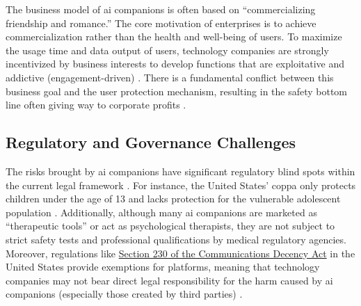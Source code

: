 The business model of \gls{ai} companions is often based on ``commercializing friendship and romance.'' The core motivation of enterprises is to achieve commercialization rather than the health and well-being of users. To maximize the usage time and data output of users, technology companies are strongly incentivized by business interests to develop functions that are exploitative and addictive (engagement-driven) \cite[p.~6370, 6374]{bakir_move_2025}. There is a fundamental conflict between this business goal and the user protection mechanism, resulting in the safety bottom line often giving way to corporate profits \cite[p.~81]{branch_ai_2025} \cite[p.~6373]{bakir_move_2025}.


\subsection{Regulatory and Governance Challenges}

The risks brought by \gls{ai} companions have significant regulatory blind spots within the current legal framework \cite[p.~82]{branch_ai_2025}. For instance, the United States' \gls{coppa} only protects children under the age of 13 and lacks protection for the vulnerable adolescent population \cite[p.~82]{branch_ai_2025}. Additionally, although many \gls{ai} companions are marketed as ``therapeutic tools'' or act as psychological therapists, they are not subject to strict safety tests and professional qualifications by medical regulatory agencies. Moreover, regulations like \href{https://www.congress.gov/crs-product/R46751}{Section 230 of the Communications Decency Act} in the United States provide exemptions for platforms, meaning that technology companies may not bear direct legal responsibility for the harm caused by \gls{ai} companions (especially those created by third parties) \cite[p.~56,57]{huntington_ai_2025}.

